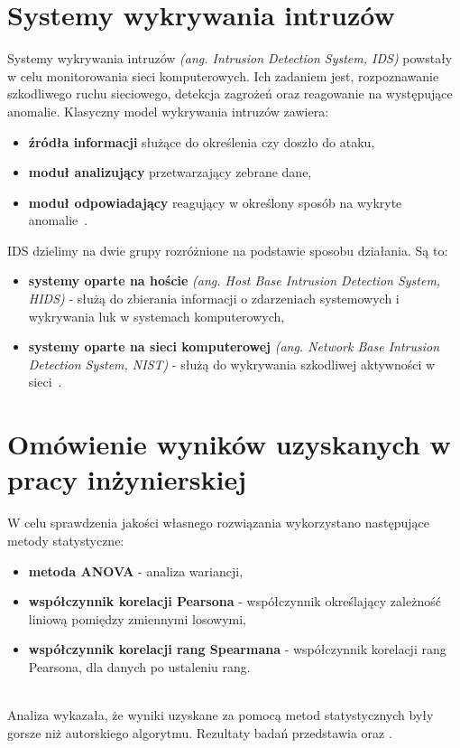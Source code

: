 \section{Systemy wykrywania intruzów}
Systemy wykrywania intruzów \textit{(ang. Intrusion Detection System, IDS)} powstały w celu monitorowania sieci komputerowych. Ich zadaniem jest, rozpoznawanie szkodliwego ruchu sieciowego, detekcja zagrożeń oraz reagowanie na występujące anomalie. Klasyczny model wykrywania intruzów zawiera:
\begin{itemize}
\item \textbf{źródła informacji} służące do określenia czy doszło do ataku,
\item \textbf{moduł analizujący} przetwarzający zebrane dane,
\item \textbf{moduł odpowiadający} reagujący w określony sposób na wykryte anomalie~\cite{SazzadulHoque2012, Bacer, Blyszcz2022}.
\end{itemize}
IDS dzielimy na dwie grupy rozróżnione na podstawie sposobu działania. Są to:
\begin{itemize}
    \item \textbf{systemy oparte na hoście} \textit{(ang. Host Base Intrusion Detection System, HIDS)} - służą do zbierania informacji o zdarzeniach systemowych i wykrywania luk w systemach komputerowych,
    \item \textbf{systemy oparte na sieci komputerowej} \textit{(ang. Network Base Intrusion Detection System, NIST)} - służą do wykrywania szkodliwej aktywności w sieci~\cite{Blyszcz2022, SazzadulHoque2012, chawlaashima}.
\end{itemize}


\section{Omówienie  wyników uzyskanych w pracy inżynierskiej}\label{sec:inz-rez-pod}
W celu sprawdzenia jakości własnego rozwiązania wykorzystano następujące metody statystyczne:

\begin{itemize}
    \item \textbf{metoda ANOVA} - analiza wariancji,
    \item \textbf{współczynnik korelacji Pearsona} - współczynnik określający zależność liniową pomiędzy zmiennymi losowymi,
    \item \textbf{współczynnik korelacji rang Spearmana} - współczynnik korelacji rang Pearsona, dla danych po ustaleniu rang.
\end{itemize}
\ \\
Analiza wykazała, że wyniki uzyskane za pomocą metod statystycznych były gorsze niż autorskiego algorytmu. Rezultaty badań przedstawia  oraz .\

